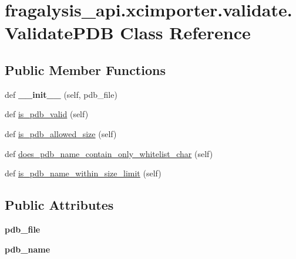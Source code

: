 \hypertarget{classfragalysis__api_1_1xcimporter_1_1validate_1_1_validate_p_d_b}{}\section{fragalysis\+\_\+api.\+xcimporter.\+validate.\+Validate\+P\+DB Class Reference}
\label{classfragalysis__api_1_1xcimporter_1_1validate_1_1_validate_p_d_b}
\subsection*{Public Member Functions}
\begin{DoxyCompactItemize}
\item 
\mbox{\label{classfragalysis__api_1_1xcimporter_1_1validate_1_1_validate_p_d_b_a2b688d0708ea4b2c01e2c436ff11b8b5}} 
def {\bfseries \+\_\+\+\_\+init\+\_\+\+\_\+} (self, pdb\+\_\+file)
\item 
def \hyperlink{classfragalysis__api_1_1xcimporter_1_1validate_1_1_validate_p_d_b_a7e6b2f1b0ea513e4485fabb411c5f3f5}{is\+\_\+pdb\+\_\+valid} (self)
\item 
def \hyperlink{classfragalysis__api_1_1xcimporter_1_1validate_1_1_validate_p_d_b_a9e9a8abbb1d90bb2cd17702178831f93}{is\+\_\+pdb\+\_\+allowed\+\_\+size} (self)
\item 
def \hyperlink{classfragalysis__api_1_1xcimporter_1_1validate_1_1_validate_p_d_b_a0775261c2b35a1f1861dabccbba32d02}{does\+\_\+pdb\+\_\+name\+\_\+contain\+\_\+only\+\_\+whitelist\+\_\+char} (self)
\item 
def \hyperlink{classfragalysis__api_1_1xcimporter_1_1validate_1_1_validate_p_d_b_a23b89548ce5a6619636348c711b7b27e}{is\+\_\+pdb\+\_\+name\+\_\+within\+\_\+size\+\_\+limit} (self)
\end{DoxyCompactItemize}
\subsection*{Public Attributes}
\begin{DoxyCompactItemize}
\item 
\mbox{\label{classfragalysis__api_1_1xcimporter_1_1validate_1_1_validate_p_d_b_a9c42b0ed963d65498056ac184793b0f0}} 
{\bfseries pdb\+\_\+file}
\item 
\mbox{\label{classfragalysis__api_1_1xcimporter_1_1validate_1_1_validate_p_d_b_a00933241a00b230d44e1c90155a797d6}} 
{\bfseries pdb\+\_\+name}
\end{DoxyCompactItemize}


